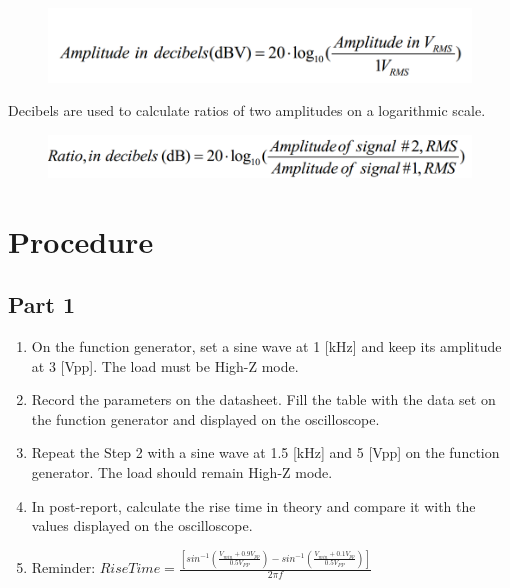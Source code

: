 \documentclass{article}
\begin{document}
\begin{enumerate}
\begin{figure}[H]
	\centering
	\includegraphics[width=0.6\linewidth]{p15}
	\label{fig:p15}
\end{figure}
Decibels are used to calculate ratios of two amplitudes on a logarithmic scale.
\begin{figure}[H]
	\centering
	\includegraphics[width=0.7\linewidth]{p16}
	\label{fig:p16}
\end{figure}
\end{enumerate}
\section{Procedure}
\subsection{Part 1}
\begin{enumerate}
	\item On the function generator, set a sine wave at 1 [kHz] and keep its amplitude
	at 3 [Vpp]. The load must be High-Z mode.
	\item Record the parameters on the datasheet. Fill the table with the data set on the
	function generator and displayed on the oscilloscope.
	\item Repeat the Step 2 with a sine wave at 1.5 [kHz] and 5 [Vpp] on the function
	generator. The load should remain High-Z mode.
	\item In post-report, calculate the rise time in theory and compare it with the values
	displayed on the oscilloscope.
	\item Reminder: $RiseTime=\frac{[sin^{-1}(\frac{V_{min}+0.9V_{pp}}{0.5V_{PP}})-sin^{-1}(\frac{V_{min}+0.1V_{pp}}{0.5V_{PP}})]}{2\pi f}$
\end{enumerate}
\end{document}
